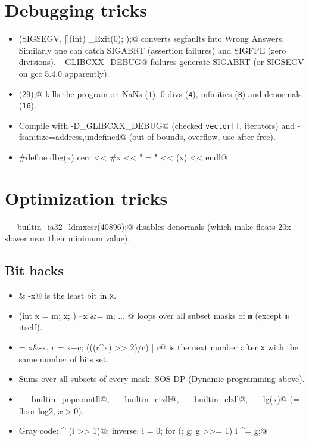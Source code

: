 \section{Debugging tricks}
	\begin{itemize}
		\item \verb@signal(SIGSEGV, [](int) { _Exit(0); });@ converts segfaults into Wrong Answers.
			Similarly one can catch SIGABRT (assertion failures) and SIGFPE (zero divisions).
			\verb@_GLIBCXX_DEBUG@ failures generate SIGABRT (or SIGSEGV on gcc 5.4.0 apparently).
		\item \verb@feenableexcept(29);@ kills the program on NaNs (\texttt 1), 0-divs (\texttt 4), infinities (\texttt 8) and denormals (\texttt{16}).
		\item Compile with \verb@-D_GLIBCXX_DEBUG@ (checked \texttt{vector[]}, iterators) and
			\verb@-fsanitize=address,undefined@ (out of bounds, overflow, use after free).
		\item \verb@#define dbg(x) cerr << #x << " = " << (x) << endl@
	\end{itemize}

\section{Optimization tricks}
	\verb@__builtin_ia32_ldmxcsr(40896);@ disables denormals (which make floats 20x slower near their minimum value).
	\subsection{Bit hacks}
		\begin{itemize}
			\item \verb@x & -x@ is the least bit in \texttt{x}.
			\item \verb@for (int x = m; x; ) { --x &= m; ... }@ loops over all subset masks of \texttt{m} (except \texttt{m} itself).
			\item \verb@c = x&-x, r = x+c; (((r^x) >> 2)/c) | r@ is the next number after \texttt{x} with the same number of bits set.
			\item Sums over all subsets of every mask: SOS DP (Dynamic programming above).
			\item \verb@__builtin_popcountll@, \verb@__builtin_ctzll@, \verb@__builtin_clzll@,
				\verb@__lg(x)@ (= floor log2, $x > 0$).
			\item Gray code: \verb@i ^ (i >> 1)@; inverse: \verb@int i = 0; for (; g; g >>= 1) i ^= g;@
		\end{itemize}
